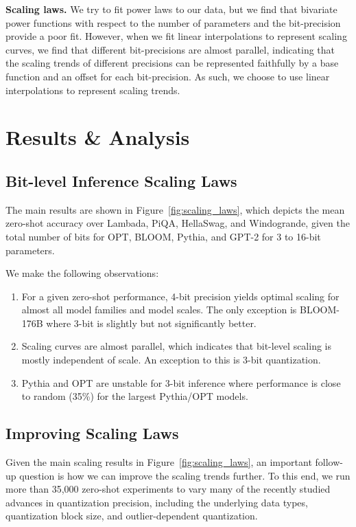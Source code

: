 \textbf{Scaling laws.} We try to fit power laws to our data, but we find that bivariate power functions with respect to the number of parameters and the bit-precision provide a poor fit. However, when we fit linear interpolations to represent scaling curves, we find that different bit-precisions are almost parallel, indicating that the scaling trends of different precisions can be represented faithfully by a base function and an offset for each bit-precision. As such, we choose to use linear interpolations to represent scaling trends.

\section{Results \& Analysis}

\subsection{Bit-level Inference Scaling Laws}

The main results are shown in Figure~\ref{fig:scaling_laws}, which depicts the mean zero-shot accuracy over Lambada, PiQA, HellaSwag, and Windogrande, given the total number of bits for OPT, BLOOM, Pythia, and GPT-2 for 3 to 16-bit parameters.

We make the following observations:

\begin{enumerate}
\itemsep=-0em
    \item For a given zero-shot performance, 4-bit precision yields optimal scaling for almost all model families and model scales. The only exception is BLOOM-176B where 3-bit is slightly but not significantly better.
    \item Scaling curves are almost parallel, which indicates that bit-level scaling is mostly independent of scale. An exception to this is 3-bit quantization.
    \item Pythia and OPT are unstable for 3-bit inference where performance is close to random (35\%) for the largest Pythia/OPT models.
\end{enumerate}

\subsection{Improving Scaling Laws}

Given the main scaling results in Figure~\ref{fig:scaling_laws}, an important follow-up question is how we can improve the scaling trends further. To this end, we run more than 35,000 zero-shot experiments to vary many of the recently studied advances in quantization precision, including the underlying data types, quantization block size, and outlier-dependent quantization.

